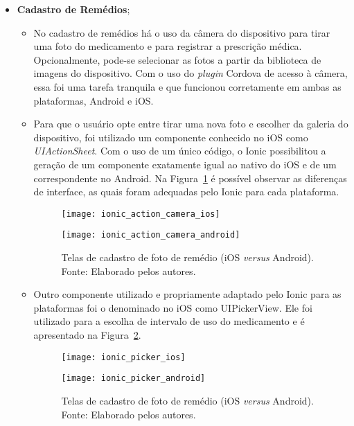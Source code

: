 \begin{itemize}
\begin{itemize}
		\end{itemize}

 	\item \textbf{Cadastro de Remédios};
 	
 		 \begin{itemize}
			\item No cadastro de remédios há o uso da câmera do dispositivo para tirar uma foto do medicamento e para registrar a prescrição médica. Opcionalmente, pode-se selecionar as fotos a partir da biblioteca de imagens do dispositivo. Com o uso do \textit{plugin} Cordova de acesso à câmera, essa foi uma tarefa tranquila e que funcionou corretamente em ambas as plataformas, Android e iOS. 
			\item Para que o usuário opte entre  tirar uma nova foto e escolher da galeria do dispositivo, foi utilizado um componente conhecido no iOS como \textit{UIActionSheet}. Com o uso de um único código, o Ionic possibilitou a geração de um componente exatamente igual ao nativo do iOS e de um correspondente no Android. 
			Na Figura~\ref{fig:ionic_action_camera} é possível observar as diferenças de interface, as quais foram adequadas pelo Ionic para cada plataforma.
			
			 \begin{figure}
			 	\centering
			 	\begin{minipage}{.5\textwidth}
			 		\centering
			 		\texttt{[image: ionic\_action\_camera\_ios]}
			 	\end{minipage}%
			 	\begin{minipage}{.5\textwidth}
			 		\centering
			 		\texttt{[image: ionic\_action\_camera\_android]}
			 	\end{minipage}
			 	\caption[Telas de cadastro de foto de remédio (iOS \textit{versus} Android)]{ Telas de cadastro de foto de 
				 remédio (iOS \textit{versus} Android). Fonte: Elaborado pelos autores.}
			 	\label{fig:ionic_action_camera}
			 \end{figure}

			\item Outro componente utilizado e propriamente adaptado pelo Ionic para as plataformas foi o denominado no iOS como UIPickerView.
			Ele foi utilizado para a escolha de intervalo de uso do medicamento e é apresentado na Figura~\ref{fig:ionic_picker}.
			 
			 \begin{figure}
			 	\centering
			 	\begin{minipage}{.5\textwidth}
			 		\centering
			 		\texttt{[image: ionic\_picker\_ios]}
			 	\end{minipage}%
			 	\begin{minipage}{.5\textwidth}
			 		\centering
			 		\texttt{[image: ionic\_picker\_android]}
			 	\end{minipage}
			 	\caption[Telas de cadastro de foto de remédio (iOS \textit{versus} Android)]{ Telas de cadastro de foto de 
				 remédio (iOS \textit{versus} Android). Fonte: Elaborado pelos autores.}
			 	\label{fig:ionic_picker}
			 \end{figure}
			 

\end{itemize}
\end{itemize}
